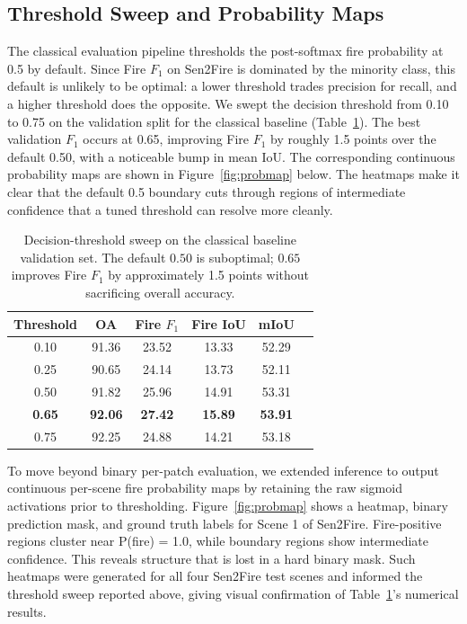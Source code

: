 \documentclass{article}
\begin{document}
\subsection{Threshold Sweep and Probability Maps}
\label{sec:threshold}

The classical evaluation pipeline thresholds the post-softmax fire probability at 0.5 by default. Since Fire $F_1$ on Sen2Fire is dominated by the minority class, this default is unlikely to be optimal: a lower threshold trades precision for recall, and a higher threshold does the opposite. We swept the decision threshold from 0.10 to 0.75 on the validation split for the classical baseline (Table~\ref{tab:threshold}). The best validation $F_1$ occurs at 0.65, improving Fire $F_1$ by roughly 1.5 points over the default 0.50, with a noticeable bump in mean IoU. The corresponding continuous probability maps are shown in Figure~\ref{fig:probmap} below. The heatmaps make it clear that the default 0.5 boundary cuts through regions of intermediate confidence that a tuned threshold can resolve more cleanly.

\begin{table}[H]
    \centering
    \begin{tabular}{cccccc}
        \toprule
        Threshold & OA & Fire $F_1$ & Fire IoU & mIoU \\
        \midrule
        0.10 & 91.36 & 23.52 & 13.33 & 52.29 \\
        0.25 & 90.65 & 24.14 & 13.73 & 52.11 \\
        0.50 & 91.82 & 25.96 & 14.91 & 53.31 \\
        \textbf{0.65} & \textbf{92.06} & \textbf{27.42} & \textbf{15.89} & \textbf{53.91} \\
        0.75 & 92.25 & 24.88 & 14.21 & 53.18 \\
        \bottomrule
    \end{tabular}
    \caption{Decision-threshold sweep on the classical baseline validation set. The default $0.50$ is suboptimal; $0.65$ improves Fire $F_1$ by approximately 1.5 points without sacrificing overall accuracy.}
    \label{tab:threshold}
\end{table}



To move beyond binary per-patch evaluation, we extended inference to output continuous per-scene fire probability maps by retaining the raw sigmoid activations prior to thresholding. Figure~\ref{fig:probmap} shows a heatmap, binary prediction mask, and ground truth labels for Scene 1 of Sen2Fire. Fire-positive regions cluster near P(fire) = 1.0, while boundary regions show intermediate confidence. This reveals structure that is lost in a hard binary mask. Such heatmaps were generated for all four Sen2Fire test scenes and informed the threshold sweep reported above, giving visual confirmation of Table~\ref{tab:threshold}'s numerical results.
\end{document}
